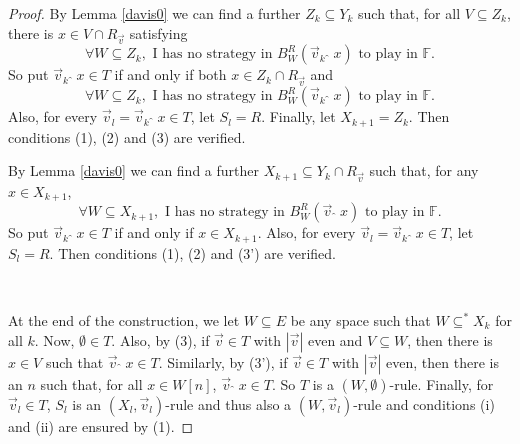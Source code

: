 \documentclass[10pt]{amsart}
\newcommand {\F}{\mathbb F}
\newcommand{\con}{\;\hat{}\;}
\newcommand{\tom} {\emptyset}
\renewcommand {\a} {\forall}
\theoremstyle{definition}
\begin{document}
\begin{proof}
By Lemma \ref{davis0} we can find  a further $Z_k\subseteq Y_k$  such that, for all $V\subseteq Z_k$, there is $x\in V\cap R_{\vec v}$ satisfying 
$$
\a W\subseteq Z_k, \text{ I has no strategy in $B^{R}_W(\vec v_k\con x)$ to play in $\F$}.
$$
So put $\vec v_k\con x\in T$ if and only if both $x\in Z_k\cap R_{\vec v}$ and 
$$
\a W\subseteq Z_k, \text{ I has no strategy in $B^{R}_W(\vec v_k\con x)$ to play in $\F$}.
$$
Also,  for every $\vec v_l=\vec v_k\con x\in T$, let $S_l=R$. Finally, let $X_{k+1}=Z_k$. Then conditions (1), (2) and (3) are verified. 


By Lemma \ref{davis0} we can find  a further $X_{k+1}\subseteq Y_k\cap R_{\vec v}$ such that, for any $x\in X_{k+1}$, 
$$
\a W\subseteq X_{k+1},  \text{ I has no strategy in $B^{R}_W(\vec v\con x)$ to play in $\F$}.
$$
So put $\vec v_k\con x\in T$ if and only if $x\in X_{k+1}$. Also, for every $\vec v_l=\vec v_k\con x\in T$, let $S_l=R$. Then conditions (1), (2) and (3') are verified. 

\

At the end of the construction, we let $W\subseteq E$ be any space such that $W\subseteq^*X_k$ for all $k$. Now, $\tom \in T$. Also, by (3), if $\vec v\in T$ with  $|\vec v|$ even and $V\subseteq W$, then there is $x\in V$ such that $\vec v\con x\in T$. Similarly, by (3'), if $\vec v\in T$ with  $|\vec v|$ even, then there is an $n$ such that, for all $x\in W[n]$, $\vec v\con x\in T$. So $T$ is a $(W,\tom)$-rule. Finally, for $\vec v_l\in T$, $S_l$ is an $(X_{l},\vec v_l)$-rule and thus also a $(W,\vec v_l)$-rule and conditions (i) and (ii) are ensured by (1).
\end{proof}
\end{document}

